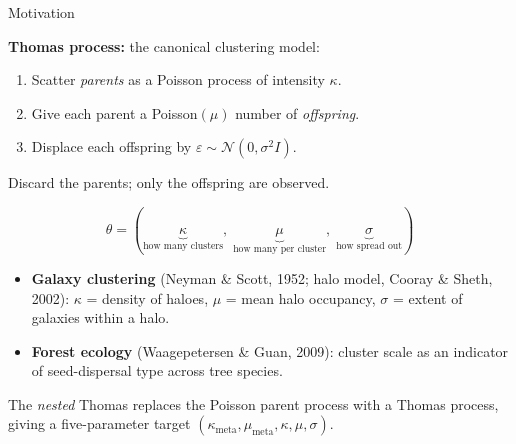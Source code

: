 \documentclass[aspectratio=169,10pt]{beamer}
\begin{document}
\begin{frame}{Motivation}
\vspace{-2pt}
{\footnotesize
\textbf{Thomas process:} the canonical clustering model:
\begin{enumerate}\setlength\itemsep{1pt}
  \item Scatter \emph{parents} as a Poisson process of intensity
        $\kappa$.
  \item Give each parent a Poisson$(\mu)$ number of \emph{offspring}.
  \item Displace each offspring by $\varepsilon \sim \mathcal{N}(0,\sigma^2 I)$.
\end{enumerate}
\vspace{-2pt}
Discard the parents; only the offspring are observed.}
\[
\theta = (\underbrace{\kappa}_{\text{how many clusters}},\;
          \underbrace{\mu}_{\text{how many per cluster}},\;
          \underbrace{\sigma}_{\text{how spread out}})
\]
\vspace{-10pt}

{\footnotesize
\begin{itemize}\setlength\itemsep{1pt}
  \item \textbf{Galaxy clustering} (Neyman \& Scott, 1952; halo model, Cooray \&
        Sheth, 2002): $\kappa$ = density of haloes, $\mu$ = mean halo
        occupancy, $\sigma$ = extent of galaxies within a halo.
  \item \textbf{Forest ecology} (Waagepetersen \& Guan, 2009): cluster scale as
        an indicator of seed-dispersal type across tree species.
\end{itemize}}
\vspace{2pt}
\begin{center}
\end{center}
\vspace{2pt}
{\color{cgray}\scriptsize
The \emph{nested} Thomas replaces the Poisson parent process with a Thomas
process, giving a five-parameter target
$(\kappa_{\text{meta}}, \mu_{\text{meta}}, \kappa, \mu, \sigma)$.}
\end{frame}
\end{document}
